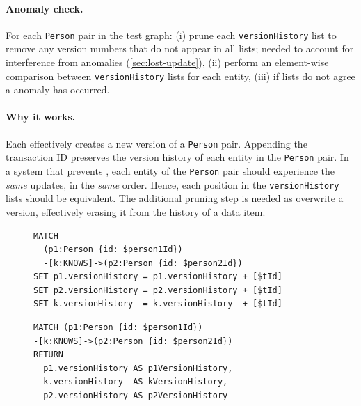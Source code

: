 \paragraph{Anomaly check.}
For each \texttt{Person} pair in the test graph: (i) prune each \texttt{versionHistory} list to remove any version numbers that do not appear in all lists; needed to account for interference from  anomalies (\autoref{sec:lost-update}), (ii) perform an element-wise comparison between \texttt{versionHistory} lists for each entity, (iii) if lists do not agree a  anomaly has occurred.

\paragraph{Why it works.}
Each  effectively creates a new version of a \texttt{Person} pair.
Appending the transaction ID preserves the version history of each entity in the \texttt{Person} pair.
In a system that prevents , each entity of the \texttt{Person} pair should experience the \emph{same} updates, in the \emph{same} order.
Hence, each position in the \texttt{versionHistory} lists should be equivalent.
The additional pruning step is needed as 
overwrite a version, effectively erasing it from the history of a data item.

\begin{figure}[htb]
  \centering
  \begin{minipage}{0.53\linewidth}
\begin{lstlisting}[language=cypher,label=fig:dw1,caption=\tx{Dirty Write (G0) $T_\mathrm{W}$}.]
MATCH
  (p1:Person {id: $person1Id})
  -[k:KNOWS]->(p2:Person {id: $person2Id})
SET p1.versionHistory = p1.versionHistory + [$tId]
SET p2.versionHistory = p2.versionHistory + [$tId]
SET k.versionHistory  = k.versionHistory  + [$tId]
\end{lstlisting}
\end{minipage}
\quad
\begin{minipage}{0.431\linewidth}
\begin{lstlisting}[language=cypher,label=fig:dw2,caption=\tx{Dirty Write (G0) $T_\mathrm{R}$}.]
MATCH (p1:Person {id: $person1Id})
-[k:KNOWS]->(p2:Person {id: $person2Id})
RETURN
  p1.versionHistory AS p1VersionHistory,
  k.versionHistory  AS kVersionHistory,
  p2.versionHistory AS p2VersionHistory
\end{lstlisting}
\end{minipage}
\end{figure}

